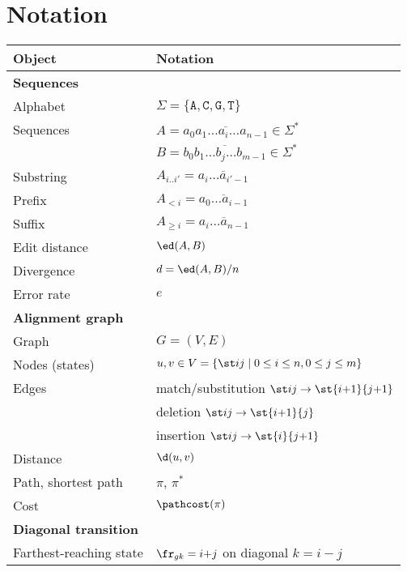 \newcommand*{\tabindent}{\hspace{2mm}}

\section{Notation}\label{sec:notation}

\begin{tabular}[H]{ll}
  \toprule
  \textbf{Object}	         & \textbf{Notation}\\
  \midrule
  \textbf{Sequences}  & \\
  \tabindent Alphabet            	&
									$\Sigma = \{\mathtt A,\mathtt C,\mathtt G,\mathtt T\}$ \\
  \tabindent Sequences            &
									$A = \overline{a_0a_1 \dots a_i \dots a_{n-1}}\in \Sigma^*$\\
							 & $B = \overline{b_0b_1 \dots b_j \dots b_{m-1}} \in \Sigma^*$ \\
  \tabindent Substring          & $A_{i..i'} = \overline{a_i \dots a_{i'-1}}$ \\
  \tabindent Prefix & $A_{< i} = \overline{a_0 \dots a_{i-1}}$ \\
  \tabindent Suffix & $A_{\geq i} = \overline{a_i \dots a_{n-1}}$ \\
  \tabindent Edit distance        & $\ed(A,B)$\\
  \tabindent Divergence        & $d = \ed(A,B) / n$\\
  \tabindent Error rate        & $e$\\
  \midrule
  \textbf{Alignment graph} & \\
  \tabindent Graph& $G=(V,E)$\\
  \tabindent Nodes (states) & $u,v \in V=\{\st ij \mid 0\leq i\leq n, 0\leq j
								 \leq m\}$\\
  \tabindent Edges& match/substitution $\st ij \to \st {i{+}1}{j{+}1}$\\
							 & deletion $\st ij \to \st {i{+}1}{j}$\\
							 & insertion $\st ij \to \st {i}{j{+}1}$\\
  \tabindent Distance & $\d(u, v)$\\
  \tabindent Path, shortest path & $\pi$, $\pi^*$\\
  \tabindent Cost & $\pathcost(\pi)$\\
  \midrule
  \textbf{Diagonal transition} & \\
  \tabindent Farthest-reaching state & $\fr_{gk} = i{+}j$ on diagonal $k{=}i{-}j$ \\

\end{tabular}
